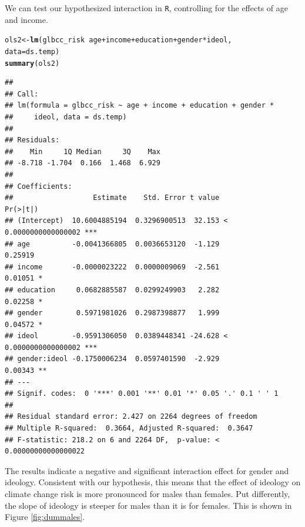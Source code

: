 \documentclass[11pt,openany]{book}\usepackage[]{graphicx}\usepackage[]{color}
\makeatletter
\newcommand{\hlopt}[1]{\textcolor[rgb]{0,0,0}{#1}}%
\newcommand{\hlstd}[1]{\textcolor[rgb]{0.345,0.345,0.345}{#1}}%
\newcommand{\hlkwb}[1]{\textcolor[rgb]{0.69,0.353,0.396}{#1}}%
\newcommand{\hlkwc}[1]{\textcolor[rgb]{0.333,0.667,0.333}{#1}}%
\newcommand{\hlkwd}[1]{\textcolor[rgb]{0.737,0.353,0.396}{\textbf{#1}}}%
\newenvironment{kframe}{%
 \def\at@end@of@kframe{}%
 \ifinner\ifhmode%
  \def\at@end@of@kframe{\end{minipage}}%
  \begin{minipage}{\columnwidth}%
 \fi\fi%
 \def\FrameCommand##1{\hskip\@totalleftmargin \hskip-\fboxsep
 \colorbox{shadecolor}{##1}\hskip-\fboxsep
     \hskip-\linewidth \hskip-\@totalleftmargin \hskip\columnwidth}%
 \MakeFramed {\advance\hsize-\width
   \@totalleftmargin\z@ \linewidth\hsize
   \@setminipage}}%
 {\par\unskip\endMakeFramed%
 \at@end@of@kframe}
\newenvironment{knitrout}{}{} %
\renewenvironment{knitrout}{\begin{singlespace}}{\end{singlespace}} %
\makeatother
\begin{document}
We can test our hypothesized interaction in \texttt{R}, controlling for the effects of age
and income. 
\begin{knitrout}
\color{fgcolor}\begin{kframe}
\begin{alltt}
\hlstd{ols2} \hlkwb{<-} \hlkwd{lm}\hlstd{(glbcc_risk} \hlopt{~} \hlstd{age} \hlopt{+} \hlstd{income} \hlopt{+} \hlstd{education} \hlopt{+} \hlstd{gender} \hlopt{*} \hlstd{ideol,}
    \hlkwc{data} \hlstd{= ds.temp)}
\hlkwd{summary}\hlstd{(ols2)}
\end{alltt}
\begin{verbatim}
## 
## Call:
## lm(formula = glbcc_risk ~ age + income + education + gender * 
##     ideol, data = ds.temp)
## 
## Residuals:
##    Min     1Q Median     3Q    Max 
## -8.718 -1.704  0.166  1.468  6.929 
## 
## Coefficients:
##                   Estimate    Std. Error t value             Pr(>|t|)    
## (Intercept)  10.6004885194  0.3296900513  32.153 < 0.0000000000000002 ***
## age          -0.0041366805  0.0036653120  -1.129              0.25919    
## income       -0.0000023222  0.0000009069  -2.561              0.01051 *  
## education     0.0682885587  0.0299249903   2.282              0.02258 *  
## gender        0.5971981026  0.2987398877   1.999              0.04572 *  
## ideol        -0.9591306050  0.0389448341 -24.628 < 0.0000000000000002 ***
## gender:ideol -0.1750006234  0.0597401590  -2.929              0.00343 ** 
## ---
## Signif. codes:  0 '***' 0.001 '**' 0.01 '*' 0.05 '.' 0.1 ' ' 1
## 
## Residual standard error: 2.427 on 2264 degrees of freedom
## Multiple R-squared:  0.3664,	Adjusted R-squared:  0.3647 
## F-statistic: 218.2 on 6 and 2264 DF,  p-value: < 0.00000000000000022
\end{verbatim}
\end{kframe}
\end{knitrout}
The results indicate a negative and significant interaction effect for gender and ideology. Consistent with our hypothesis, this means that the effect of ideology on climate change risk is more pronounced for males than females. Put differently, the slope of ideology is steeper for males than it is for females. This is shown in Figure \ref{fig:dummales}. 
\end{document}
